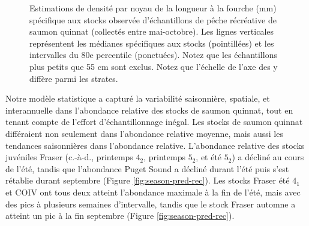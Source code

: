 \begin{figure}[H]
    \centering
    \caption{Estimations de densité par noyau de la longueur à la fourche (mm) spécifique aux stocks observée d'échantillons de pêche récréative de saumon quinnat (collectés entre mai-octobre). Les lignes verticales représentent les médianes spécifiques aux stocks (pointillées) et les intervalles du 80e percentile (ponctuées). Notez que les échantillons plus petits que 55 cm sont exclus. Notez que l'échelle de l'axe des y diffère parmi les strates.}
    \label{fig:density-fl}
\end{figure}

Notre modèle statistique a capturé la variabilité saisonnière, spatiale, et interannuelle dans l'abondance relative des stocks de saumon quinnat, tout en tenant compte de l'effort d'échantillonnage inégal. Les stocks de saumon quinnat différaient non seulement dans l'abondance relative moyenne, mais aussi les tendances saisonnières dans l'abondance relative. L'abondance relative des stocks juvéniles Fraser (c.-à-d., printemps $4_2$, printemps $5_2$, et été $5_2$) a décliné au cours de l'été, tandis que l'abondance Puget Sound a décliné durant l'été puis s'est rétablie durant septembre (Figure \ref{fig:season-pred-rec}). Les stocks Fraser été $4_1$ et COIV ont tous deux atteint l'abondance maximale à la fin de l'été, mais avec des pics à plusieurs semaines d'intervalle, tandis que le stock Fraser automne a atteint un pic à la fin septembre (Figure \ref{fig:season-pred-rec}).


